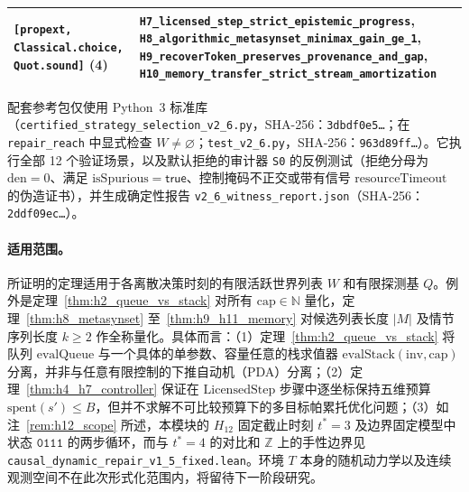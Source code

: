 \documentclass[11pt,a4paper]{article}
\theoremstyle{cleanthm}
\theoremstyle{cleandef}
\begin{document}
\begin{table}[!htbp]
\begin{tabularx}{\linewidth}{@{}l >{\raggedright\arraybackslash}X@{}}
\texttt{[propext, Classical.choice, Quot.sound]} (4) & \texttt{H7\_licensed\_\allowbreak step\_\allowbreak strict\_\allowbreak epistemic\_\allowbreak progress}, \texttt{H8\_algorithmic\_\allowbreak metasynset\_\allowbreak minimax\_\allowbreak gain\_\allowbreak ge\_1}, \texttt{H9\_recoverToken\_\allowbreak preserves\_\allowbreak provenance\_\allowbreak and\_\allowbreak gap}, \texttt{H10\_memory\_\allowbreak transfer\_\allowbreak strict\_\allowbreak stream\_\allowbreak amortization} \\
\bottomrule
\end{tabularx}
\end{table}

配套参考包仅使用 Python~3 标准库（\texttt{certified\_\allowbreak strategy\_\allowbreak selection\_\allowbreak v2\_6.py}，SHA-256：\texttt{3dbdf0e5\ldots}；在 \texttt{repair\_reach} 中显式检查 $W\neq\varnothing$；\texttt{test\_v2\_6.py}，SHA-256：\texttt{963d89ff\ldots}）。它执行全部 12 个验证场景，以及默认拒绝的审计器 \texttt{S0} 的反例测试（拒绝分母为 $\mathrm{den}=0$、满足 $\mathrm{isSpurious}=\mathsf{true}$、控制掩码不正交或带有信号 $\mathrm{resourceTimeout}$ 的伪造证书），并生成确定性报告 \texttt{v2\_6\_witness\_report.json}（SHA-256：\texttt{2ddf09ec\ldots}）。

\paragraph{适用范围。}
所证明的定理适用于各离散决策时刻的有限活跃世界列表 $W$ 和有限探测基 $Q$。例外是定理~\ref{thm:h2_queue_vs_stack} 对所有 $\mathrm{cap}\in\mathbb{N}$ 量化，定理~\ref{thm:h8_metasynset} 至~\ref{thm:h9_h11_memory} 对候选列表长度 $|M|$ 及情节序列长度 $k\ge 2$ 作全称量化。具体而言：（1）定理~\ref{thm:h2_queue_vs_stack} 将队列 $\mathrm{evalQueue}$ 与一个具体的单参数、容量任意的栈求值器 $\mathrm{evalStack}(\mathrm{inv},\mathrm{cap})$ 分离，并非与任意有限控制的下推自动机（PDA）分离；（2）定理~\ref{thm:h4_h7_controller} 保证在 $\mathrm{LicensedStep}$ 步骤中逐坐标保持五维预算 $\mathrm{spent}(s')\le B$，但并不求解不可比较预算下的多目标帕累托优化问题；（3）如注~\ref{rem:h12_scope} 所述，本模块的 $H_{12}$ 固定截止时刻 $t^*=3$ 及边界固定模型中状态 $\mathtt{0111}$ 的两步循环，而与 $t^*=4$ 的对比和 $\mathbb{Z}$ 上的手性边界见 \texttt{causal\_dynamic\_repair\_v1\_5\_fixed.lean}。环境 $T$ 本身的随机动力学以及连续观测空间不在此次形式化范围内，将留待下一阶段研究。
\end{document}

